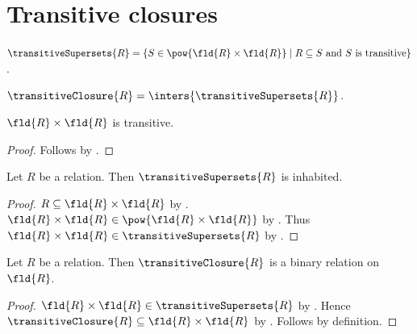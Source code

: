 

\section{Transitive closures}

\begin{definition}\label{transitive_supersets}
    $\transitiveSupersets{R} =
        \{S\in\pow{\fld{R}\times\fld{R}}\mid
            \text{$R\subseteq S$ and $S$ is transitive}\}$.
\end{definition}

\begin{definition}\label{transitive_closure}
    $\transitiveClosure{R} = \inters{\transitiveSupersets{R}}$.
\end{definition}

\begin{lemma}\label{field_square_is_transitive}
    $\fld{R}\times\fld{R}$ is transitive.
\end{lemma}
\begin{proof}
    Follows by .
\end{proof}

\begin{lemma}\label{transitive_supersets_inhabited}
    Let $R$ be a relation.
    Then $\transitiveSupersets{R}$ is inhabited.
\end{lemma}
\begin{proof}
    $R\subseteq\fld{R}\times\fld{R}$
        by .
    $\fld{R}\times\fld{R}\in\pow{\fld{R}\times\fld{R}}$
        by .
    Thus $\fld{R}\times\fld{R}\in\transitiveSupersets{R}$
        by .
\end{proof}

\begin{classification}\label{transitive_closure_type}
    Let $R$ be a relation.
    Then $\transitiveClosure{R}$ is a binary relation on $\fld{R}$.
\end{classification}
\begin{proof}
    $\fld{R}\times\fld{R}\in\transitiveSupersets{R}$
        by .
    Hence $\transitiveClosure{R}\subseteq\fld{R}\times\fld{R}$
        by .
    Follows by definition.
\end{proof}

